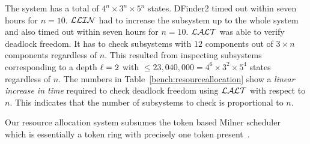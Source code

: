 The system has a total of $4^n \times 3^n \times 5^n$ states. 
DFinder2 timed out within seven hours for $n=10$. 
$\mathcal{LLIN}$ had to increase the subsystem up to the whole system and also timed out within seven hours for $n=10$. 
$\mathcal{LALT}$ was able to verify deadlock freedom. It has to check subsystems with $12$ components out of $3\times n$ components regardless of $n$. 
This resulted from inspecting subsystems corresponding to a depth $\ell=2$ with $\leq 23,040,000=4^{6} \times 3^2\times 5^4$ states regardless of $n$.
The numbers in Table~\ref{bench:resourceallocation} show a
\emph{linear increase in time} required to check deadlock freedom 
using $\mathcal{LALT}$ with respect to $n$. This indicates that the number of subsystems to check is proportional to $n$. 

Our resource allocation system subsumes the token based Milner scheduler~\cite{milner} which 
is essentially a token ring with precisely one token present~\cite{AGR16}. 

